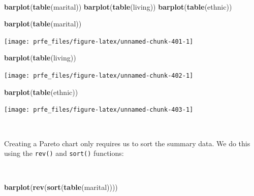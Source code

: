 \documentclass[12pt,a4paper]{book}
\newenvironment{Shaded}{\begin{snugshade}}{\end{snugshade}}
\newcommand{\KeywordTok}[1]{\textcolor[rgb]{0.13,0.29,0.53}{\textbf{#1}}}
\newcommand{\NormalTok}[1]{#1}
\theoremstyle{definition}
\theoremstyle{definition}
\theoremstyle{definition}
\theoremstyle{remark}
\begin{document}
~

\begin{Shaded}
\begin{Highlighting}[]
\KeywordTok{barplot}\NormalTok{(}\KeywordTok{table}\NormalTok{(marital))}
\KeywordTok{barplot}\NormalTok{(}\KeywordTok{table}\NormalTok{(living))}
\KeywordTok{barplot}\NormalTok{(}\KeywordTok{table}\NormalTok{(ethnic))}
\end{Highlighting}
\end{Shaded}

\newpage

\begin{Shaded}
\begin{Highlighting}[]
\KeywordTok{barplot}\NormalTok{(}\KeywordTok{table}\NormalTok{(marital))}
\end{Highlighting}
\end{Shaded}

\begin{center}\texttt{[image: prfe\_files/figure-latex/unnamed-chunk-401-1]} \end{center}

\begin{Shaded}
\begin{Highlighting}[]
\KeywordTok{barplot}\NormalTok{(}\KeywordTok{table}\NormalTok{(living))}
\end{Highlighting}
\end{Shaded}

\begin{center}\texttt{[image: prfe\_files/figure-latex/unnamed-chunk-402-1]} \end{center}

\newpage

\begin{Shaded}
\begin{Highlighting}[]
\KeywordTok{barplot}\NormalTok{(}\KeywordTok{table}\NormalTok{(ethnic))}
\end{Highlighting}
\end{Shaded}

\begin{center}\texttt{[image: prfe\_files/figure-latex/unnamed-chunk-403-1]} \end{center}

~

Creating a Pareto chart only requires us to sort the summary data. We do
this using the \texttt{rev()} and \texttt{sort()} functions:

~

\begin{Shaded}
\begin{Highlighting}[]
\KeywordTok{barplot}\NormalTok{(}\KeywordTok{rev}\NormalTok{(}\KeywordTok{sort}\NormalTok{(}\KeywordTok{table}\NormalTok{(marital))))}
\end{Highlighting}
\end{Shaded}
\end{document}
